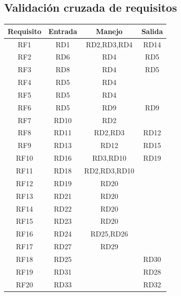 \documentclass[12pt,a4paper]{article}
\begin{document}
\subsection{Validación cruzada de requisitos}
\begin{center}
\begin{tabular}{|c|c|c|c|}
\hline
	Requisito & Entrada & Manejo & Salida\\
\hline
	RF1 & RD1 & RD2,RD3,RD4 & RD14\\
\hline
	RF2 & RD6 & RD4 & RD5\\
\hline
	RF3 & RD8 & RD4 & RD5\\
\hline
	RF4 & RD5 & RD4 & \\
\hline
	RF5 & RD5 & RD4 & \\
\hline
	RF6 & RD5 & RD9 & RD9\\
\hline
	RF7 & RD10 & RD2 & \\
\hline
	RF8 & RD11 & RD2,RD3 & RD12\\
\hline
	RF9 & RD13 & RD12 & RD15\\
\hline
	RF10 & RD16 & RD3,RD10 & RD19\\
\hline
	RF11 & RD18 & RD2,RD3,RD10 & \\
\hline
	RF12 & RD19 & RD20 & \\
\hline
	RF13 & RD21 & RD20 & \\
\hline
	RF14 & RD22 & RD20 & \\
\hline
	RF15 & RD23 & RD20 & \\
\hline
	RF16 & RD24 & RD25,RD26 & \\
\hline
	RF17 & RD27 & RD29 & \\
\hline
	RF18 & RD25 &  & RD30\\
\hline
	RF19 & RD31 &  & RD28\\
\hline
	RF20 & RD33 &  & RD32\\
\hline
\end{tabular}
\end{center}
\end{document}
